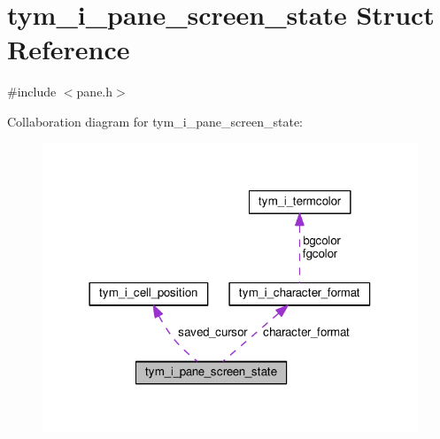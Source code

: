 \hypertarget{structtym__i__pane__screen__state}{}\section{tym\+\_\+i\+\_\+pane\+\_\+screen\+\_\+state Struct Reference}
\label{structtym__i__pane__screen__state}


{\ttfamily \#include $<$pane.\+h$>$}



Collaboration diagram for tym\+\_\+i\+\_\+pane\+\_\+screen\+\_\+state\+:
\nopagebreak
\begin{figure}[H]
\begin{center}
\leavevmode
\includegraphics[width=318pt]{structtym__i__pane__screen__state__coll__graph}
\end{center}
\end{figure}
